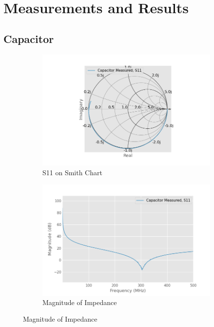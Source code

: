 \documentclass{article}
\begin{document}
\section{Measurements and Results}

\subsection{Capacitor}
\begin{figure}[h]
    \centering
    \begin{subfigure}{0.5\linewidth}
        \includegraphics[width=\linewidth]{./pics/capacitor_meas_smith.png}
        \caption{S11 on Smith Chart}
    \end{subfigure}%
    \begin{subfigure}{0.5\linewidth}
        \includegraphics[width=\linewidth]{./pics/capacitor_meas_db.png}
        \caption{Magnitude of Impedance}
    \end{subfigure}


\end{figure}
\end{document}
